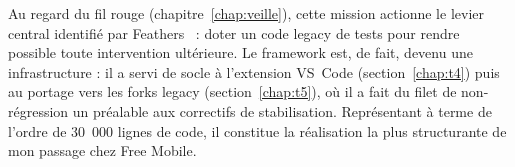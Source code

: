 Au regard du fil rouge (chapitre~\ref{chap:veille}), cette mission actionne
le levier central identifié par Feathers~\cite{feathers2004} : doter un code
legacy de tests pour rendre possible toute intervention ultérieure. Le
framework est, de fait, devenu une infrastructure : il a servi de socle à
l'extension VS~Code (section~\ref{chap:t4}) puis au portage vers les forks
legacy (section~\ref{chap:t5}), où il a fait du filet de non-régression un
préalable aux correctifs de stabilisation. Représentant à terme de l'ordre de
30~000 lignes de code, il constitue la réalisation la plus structurante de
mon passage chez Free Mobile.
